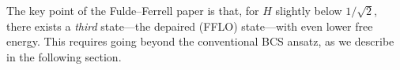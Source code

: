 The key point of the Fulde--Ferrell paper is that, for $H$ slightly
below $1/\sqrt{2}$, there exists a \emph{third} state---the depaired (FFLO)
state---with even lower free energy. This requires going beyond the
conventional BCS ansatz, as we describe in the following section.

